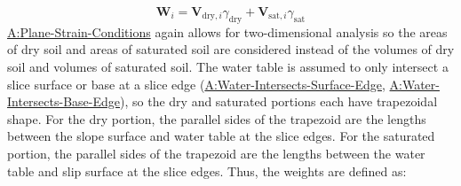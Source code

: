 \documentclass[12pt]{article}
\begin{document}
\begin{displaymath}
{\symbf{W}}_{i}={\symbf{V}_{\text{dry},i}} {γ_{\text{dry}}}+{\symbf{V}_{\text{sat},i}} {γ_{\text{sat}}}
\end{displaymath}
\hyperref[assumpPSC]{A:Plane-Strain-Conditions} again allows for two-dimensional analysis so the areas of dry soil and areas of saturated soil are considered instead of the volumes of dry soil and volumes of saturated soil. The water table is assumed to only intersect a slice surface or base at a slice edge (\hyperref[assumpWISE]{A:Water-Intersects-Surface-Edge}, \hyperref[assumpWIBE]{A:Water-Intersects-Base-Edge}), so the dry and saturated portions each have trapezoidal shape. For the dry portion, the parallel sides of the trapezoid are the lengths between the slope surface and water table at the slice edges. For the saturated portion, the parallel sides of the trapezoid are the lengths between the water table and slip surface at the slice edges. Thus, the weights are defined as:
\end{document}
